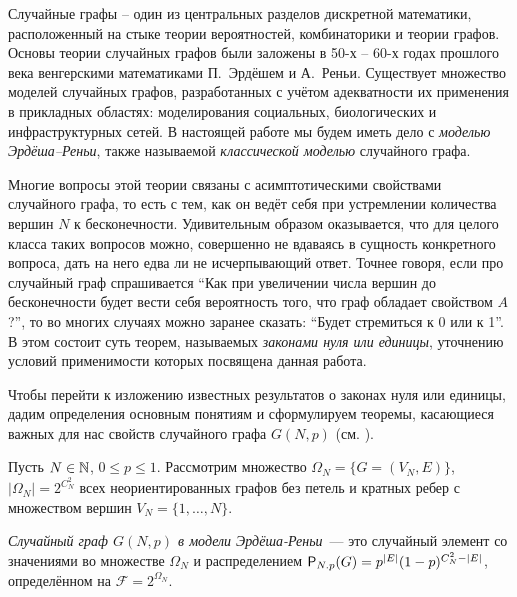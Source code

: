     Случайные графы -- один из центральных разделов дискретной математики, расположенный на стыке теории вероятностей, комбинаторики и теории графов.
    Основы теории случайных графов были заложены в 50-х -- 60-х годах прошлого века венгерскими математиками П.~Эрдёшем и А.~Реньи.
    Существует множество моделей случайных графов, разработанных с учётом адекватности их применения в прикладных областях: моделирования социальных, биологических и инфраструктурных сетей. 
    В настоящей работе мы будем иметь дело с \textit{моделью Эрдёша--Реньи}, также называемой \textit{классической моделью} случайного графа.
    
    Многие вопросы этой теории связаны с асимптотическими свойствами случайного графа, то есть с тем, как он ведёт себя при устремлении количества вершин $N$ к бесконечности.
    Удивительным образом оказывается, что для целого класса таких вопросов можно, совершенно не вдаваясь в сущность конкретного вопроса, дать на него едва ли не исчерпывающий ответ.
    Точнее говоря, если про случайный граф спрашивается ``Как при увеличении числа вершин до бесконечности будет вести себя вероятность того, что граф обладает свойством $A$?'', то во многих случаях можно заранее сказать: ``Будет стремиться к 0 или к 1''.
    В этом состоит суть теорем, называемых \textit{законами нуля или единицы}, уточнению условий применимости которых посвящена данная работа.
    
    Чтобы перейти к изложению известных результатов о законах нуля или единицы, дадим определения основным понятиям и сформулируем теоремы, касающиеся важных для нас свойств случайного графа $G(N,p)$ (см. \cite{survey2015}).
    
    Пусть $N \in \N$, $0 \leq p \leq 1$. Рассмотрим множество $\Omega_N = \{G = (V_N , E)\}$, $|\Omega_N| = 2^{C_N^2}$ всех неориентированных графов без петель и кратных ребер с множеством вершин $V_N = \{1, \ldots, N \}$.
    
    
  \Def \textit{Случайный граф $G(N, p)$  в модели Эрдёша-Реньи}~--- это случайный элемент со значениями во множестве $\Omega_N$ и распределением $\P_{N.p}(G) = p^{|E|}(1-p)^{C_N^2-|E|}$, определённом на $\mathscr{F}=2^{\Omega_N}$.
  
